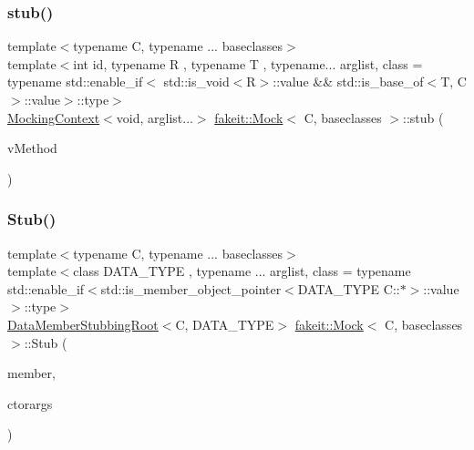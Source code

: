 \mbox{\label{classfakeit_1_1Mock_a1861b19f93de559fc183139f1ecdfa6b}} 
\subsubsection{\texorpdfstring{stub()}{stub()}\hspace{0.1cm}{\footnotesize\ttfamily [20/72]}}
{\footnotesize\ttfamily template$<$typename C, typename ... baseclasses$>$ \\
template$<$int id, typename R , typename T , typename... arglist, class  = typename std\+::enable\+\_\+if$<$                std\+::is\+\_\+void$<$\+R$>$\+::value \&\& std\+::is\+\_\+base\+\_\+of$<$\+T, C$>$\+::value$>$\+::type$>$ \\
\mbox{\hyperlink{classfakeit_1_1MockingContext}{Mocking\+Context}}$<$void, arglist...$>$ \mbox{\hyperlink{classfakeit_1_1Mock}{fakeit\+::\+Mock}}$<$ C, baseclasses $>$\+::stub (\begin{DoxyParamCaption}\item[{R(T\+::$\ast$)(arglist...) const}]{v\+Method }\end{DoxyParamCaption})\hspace{0.3cm}{\ttfamily [inline]}}

\mbox{\label{classfakeit_1_1Mock_ae210824251ca071933f8a651bbe56047}} 
\subsubsection{\texorpdfstring{Stub()}{Stub()}\hspace{0.1cm}{\footnotesize\ttfamily [6/9]}}
{\footnotesize\ttfamily template$<$typename C, typename ... baseclasses$>$ \\
template$<$class D\+A\+T\+A\+\_\+\+T\+Y\+PE , typename ... arglist, class  = typename std\+::enable\+\_\+if$<$std\+::is\+\_\+member\+\_\+object\+\_\+pointer$<$\+D\+A\+T\+A\+\_\+\+T\+Y\+P\+E C\+::$\ast$$>$\+::value$>$\+::type$>$ \\
\mbox{\hyperlink{classfakeit_1_1DataMemberStubbingRoot}{Data\+Member\+Stubbing\+Root}}$<$C, D\+A\+T\+A\+\_\+\+T\+Y\+PE$>$ \mbox{\hyperlink{classfakeit_1_1Mock}{fakeit\+::\+Mock}}$<$ C, baseclasses $>$\+::Stub (\begin{DoxyParamCaption}\item[{D\+A\+T\+A\+\_\+\+T\+Y\+PE C\+::$\ast$}]{member,  }\item[{const arglist \&...}]{ctorargs }\end{DoxyParamCaption})\hspace{0.3cm}{\ttfamily [inline]}}

